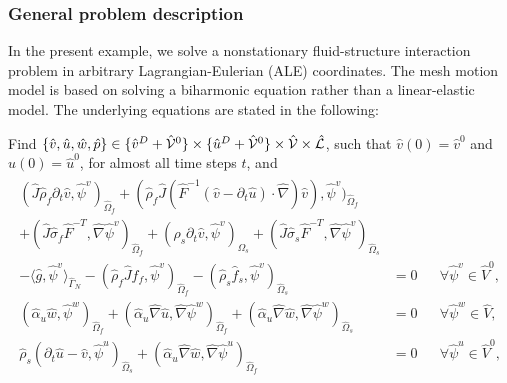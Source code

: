 \subsubsection{General problem description}

In the present example, we solve a 
nonstationary fluid-structure interaction problem in 
arbitrary Lagrangian-Eulerian (ALE) coordinates. 
The mesh motion model is based on solving a biharmonic equation
\cite{Wi11} rather than a linear-elastic model. 
The underlying equations are stated in the following:
\begin{Problem}
  \label{eq:fsi:ale:biharmonic}
  Find $\{\hat v,\hat u,\hat w,\hat p\} \in \{ \hat v^D + \hat {\cal V}^0\} 
\times \{ \hat u^D + \hat {\cal V}^0 \}\times \hat {\cal V} \times \hat {\cal
  L}$, such that $\hat v (0) = \hat v^0$ and $\hat u(0) = \hat u^0$, 
for almost all time steps $t$, and
  \begin{eqnarray*}
    \begin{aligned}
      (\hat J \hat\rho_f \partial_t \hat v,\hat\psi^v)_{\hat\Omega_f}  
      +(\hat\rho_f \hat J  (\hat F^{-1}(\hat
      v-\partial_t \hat u)\cdot\hat\nabla) \hat v),
      \hat\psi^v)_{\hat\Omega_f} &\\
      + (\hat J\hat\sigma_f\hat
      F^{-T},\hat\nabla\hat\psi^v)_{\hat\Omega_f}
      + (\hat\rho_s \partial_t \hat v,\hat\psi^v)_{\Omega_s}  
      + (\hat J\hat\sigma_s\hat F^{-T},\hat\nabla\hat\psi^v)_{\hat\Omega_s}&\\
      - \langle \hat g, \hat\psi^v \rangle_{\hat\Gamma_N} -
      (\hat\rho_f \hat J\hat f_f, \hat\psi^v)_{\hat\Omega_f}
      - (\hat\rho_s\hat f_s, \hat\psi^v)_{\hat\Omega_s}
      &= 0&&\forall\hat\psi^v\in \hat V^0,
      \\
      (\hat\alpha_u\hat w, \hat\psi^w)_{\hat\Omega_f}  + ( \hat\alpha_u\hat\nabla\hat
      u, \hat\nabla\hat\psi^w)_{\hat\Omega_f} +( \hat\alpha_u\hat\nabla\hat
      w, \hat\nabla\hat\psi^w)_{\hat\Omega_s}  
      & = 0 &&\forall\hat\psi^w\in \hat V , \\
      \hat\rho_s (\partial_t\hat u-\hat v,\hat\psi^u)_{\hat\Omega_s}
      + (\hat\alpha_u \hat \nabla \hat w,\hat \nabla\hat\psi^u)_{\hat\Omega_f}
      &=0&&\forall\hat\psi^u\in \hat V^0 ,\\    

\end{aligned}
\end{eqnarray*}
\end{Problem}
